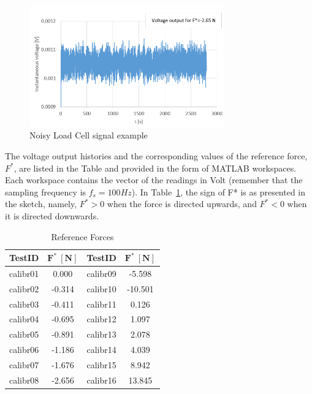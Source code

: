\documentclass[12pt]{article}
\begin{document}
        \begin{figure}[!ht]
                \includegraphics[width=0.75\textwidth]{Noise.png}
                \centering
                \caption{Noisy Load Cell signal example}
                \label{fig:noise}
        \end{figure}

        The voltage output histories and the corresponding values of the reference force, \( F^* \), are listed in the Table and provided in the form of MATLAB workspaces. Each workspace contains the vector of the readings in Volt (remember that the sampling frequency is \( f_s = 100 H\!z \)). In Table~\ref{tab:data}, the sign of F* is as presented in the sketch, namely, \( F^* > 0 \) when the force is directed upwards, and \( F^* < 0 \) when it is directed downwards.

        \begin{table}[!ht]
                \label{tab:data}
                \begin{tabular}{|cc|cc|}
                        \hline
                        \textbf{TestID} & \( \pmb{F^* \: \left[ N \right]} \) & \textbf{TestID} & \( \pmb{F^* \: \left[ N \right]} \) \\ \hline
                        calibr01        & 0.000               & calibr09        & -5.598              \\
                        calibr02        & -0.314              & calibr10        & -10.501             \\
                        calibr03        & -0.411              & calibr11        & 0.126               \\
                        calibr04        & -0.695              & calibr12        & 1.097               \\
                        calibr05        & -0.891              & calibr13        & 2.078               \\
                        calibr06        & -1.186              & calibr14        & 4.039               \\
                        calibr07        & -1.676              & calibr15        & 8.942               \\
                        calibr08        & -2.656              & calibr16        & 13.845              \\ \hline
                \end{tabular}
                \centering
                \caption{Reference Forces}
        \end{table}
\end{document}
